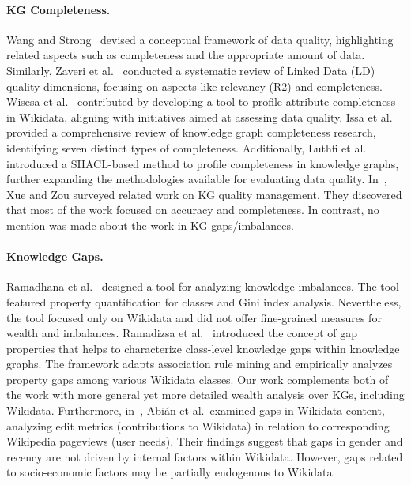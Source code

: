 \paragraph{KG Completeness.} Wang and Strong~\cite{WangS96} devised a conceptual framework of data quality, highlighting related aspects such as completeness and the appropriate amount of data. Similarly, Zaveri et al.~\cite{ZaveriRMPLA16} conducted a systematic review of Linked Data (LD) quality dimensions, focusing on aspects like relevancy (R2) and completeness.
Wisesa et al.~\cite{WisesaDKNR19} contributed by developing a tool to profile attribute completeness in Wikidata,
aligning with initiatives aimed at assessing data quality.
Issa et al.~\cite{IssaAHCDZ21} provided a comprehensive review of knowledge graph completeness research, identifying seven distinct types of completeness.
Additionally, Luthfi et al.~\cite{LuthfiDA22} introduced a SHACL-based method to profile completeness in knowledge graphs, further expanding the methodologies available for evaluating data quality.
In~\cite{XueZ23},
Xue and Zou surveyed related work on KG quality management. They discovered that
most of the work focused on accuracy and completeness. In contrast, no mention was made about the work in KG gaps/imbalances.

\paragraph{Knowledge Gaps.} Ramadhana et al.~\cite{RamadhanaDPNRA20}
designed a tool for analyzing knowledge imbalances.
The tool featured property quantification for classes and Gini index analysis.
Nevertheless, the tool focused only on Wikidata and did not offer fine-grained measures for wealth and imbalances.
Ramadizsa et al.~\cite{RamadizsaDNR23} introduced the concept of gap properties that
helps to characterize class-level knowledge gaps within knowledge graphs.
The framework adapts association rule mining and empirically analyzes property gaps among various Wikidata classes.
Our work complements both of the work with more general yet more detailed wealth analysis over KGs, including Wikidata.
Furthermore,
in~\cite{AbianMS22},
Abi{\'{a}}n et al.\ examined gaps in Wikidata content, analyzing edit metrics (contributions to Wikidata) in relation to corresponding Wikipedia pageviews (user needs). Their findings suggest that gaps in gender and recency are not driven by internal factors within Wikidata. However, gaps related to socio-economic factors may be partially endogenous to Wikidata.